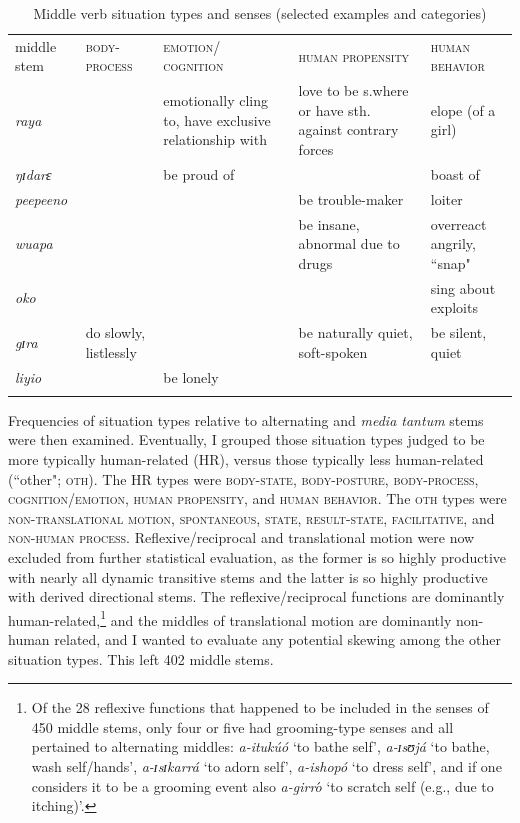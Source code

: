 \documentclass[output=paper,colorlinks,citecolor=brown
]{langscibook}
\begin{document}
\begin{table}[t]
\caption{Middle verb situation types and senses  (selected examples and categories)}
\label{tab:Payne:SitTypes}
\begin{tabular}
{
>{\RaggedRight\arraybackslash}p{1.5cm}
>{\RaggedRight\arraybackslash}p{2cm}
>{\RaggedRight\arraybackslash}p{1.9cm}
>{\RaggedRight\arraybackslash}p{1.9cm}
>{\RaggedRight\arraybackslash}p{2cm}
}
\lsptoprule
middle stem  & \textsc{body-process} & \textsc{emotion/ cognition} & \textsc{human propensity} & \textsc{human behavior} \\
\lsptoprule
\textit{raya} & & emotionally cling to, have exclusive relationship with & love to be s.where or have sth. against contrary forces & elope (of a girl)\\
\midrule
\textit{ŋɪdarɛ}  & & be proud of & & boast of\\
\midrule
\textit{peepeeno} & & & be trouble-maker & loiter \\
\midrule
\textit{wuapa} & & & be insane, abnormal due to drugs & overreact angrily, ``snap" \\
\midrule
\textit{oko} & & & & sing about exploits\\
\midrule
\textit{gɪra} & do slowly, listlessly & & be naturally quiet, soft-spoken & be silent, quiet\\
\midrule
\textit{liyio} & & be lonely\\
\lspbottomrule
\end{tabular}
\end{table}

Frequencies of situation types relative to alternating and \textit{media tantum} stems were then examined. Eventually, I grouped those situation types judged to be more typically human-related (HR), versus those typically less human-related (``other"; \textsc{oth}). The HR types were \textsc{body-state, body-posture, body-process, cognition/emotion, human propensity}, and \textsc{human behavior}. The \textsc{oth} types were \textsc{non-translational motion, spontaneous, state, result-state, facilitative}, and \textsc{non-human process}. Reflexive/reciprocal and translational motion were now excluded from further statistical evaluation, as the former is so highly productive with nearly all dynamic transitive stems and the latter is so highly productive with derived directional stems. The reflexive/reciprocal functions are dominantly human-related,\footnote{Of the 28 reflexive functions that happened to be included in the senses of 450 middle stems, only four or five had grooming-type senses and all pertained to alternating middles: \textit{a-itukúó} `to bathe self', \textit{a-ɪsʊjá}  `to bathe, wash self/hands', \textit{a-ɪsɪkarrá} `to adorn self',\textit{ a-ishopó} `to dress self', and if one considers it to be a grooming event also \textit{a-girro}́ `to scratch self (e.g., due to itching)'.} and the middles of translational motion are dominantly non-human related, and I wanted to evaluate any potential skewing among the other situation types. This left 402 middle stems.
\end{document}
